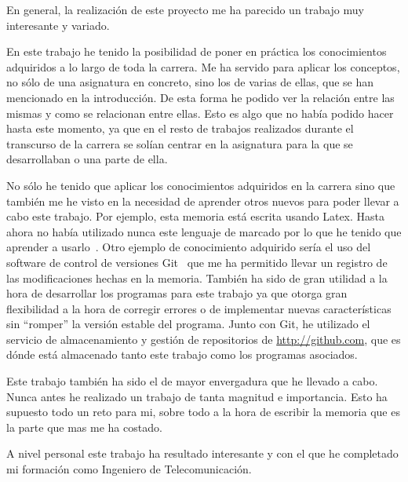 En general, la realización de este proyecto me ha parecido un trabajo muy interesante y variado.



En este trabajo he tenido la posibilidad de poner en práctica los conocimientos adquiridos a lo largo de toda la carrera. Me ha servido para aplicar los conceptos, no sólo de una asignatura en concreto, sino los de varias de ellas, que se han mencionado en la introducción. De esta forma he podido ver la relación entre las mismas y como se relacionan entre ellas. Esto es algo que no había podido hacer hasta este momento, ya que en el resto 
de trabajos realizados durante el transcurso de la carrera se solían centrar en la asignatura para la que se desarrollaban o una parte de ella.


No sólo he tenido que aplicar los conocimientos adquiridos en la carrera sino que también me he visto en la necesidad de aprender otros nuevos para poder llevar a cabo este trabajo. Por ejemplo, esta memoria está escrita usando Latex. Hasta ahora no había utilizado nunca este lenguaje de marcado por lo que he tenido que aprender a usarlo~\cite{website:latex-wikibooks}. Otro ejemplo de conocimiento adquirido sería el uso del software de control de versiones Git~\cite{git} que me ha permitido llevar un registro de las modificaciones hechas en la memoria. También ha sido de gran utilidad a la hora de desarrollar los programas para este trabajo ya que otorga gran flexibilidad a la hora de corregir errores o de implementar nuevas características sin “romper” la versión estable del programa. Junto con Git, he utilizado el servicio de almacenamiento y gestión de repositorios de \url{http://github.com}, que es dónde está almacenado tanto este trabajo como los programas asociados.

Este trabajo también ha sido el de mayor envergadura que he llevado a cabo. Nunca antes he realizado un trabajo de tanta magnitud e importancia. Esto ha supuesto todo un reto para mi, sobre todo a la hora de escribir la memoria que es la parte que mas me ha costado.

A nivel personal este trabajo ha resultado interesante y con el que he completado mi formación como Ingeniero de Telecomunicación.
